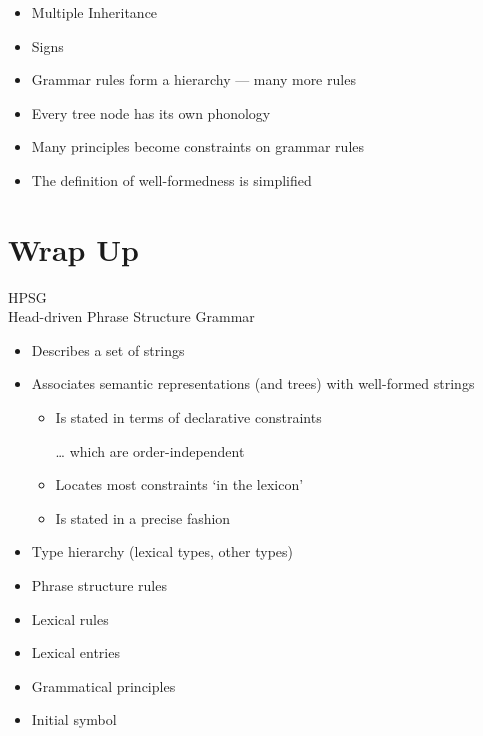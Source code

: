 \documentclass[a4paper,landscape,headrule,footrule]{foils}
\begin{document}

\begin{itemize}
\item Multiple Inheritance
\item Signs
\item Grammar rules form a hierarchy --- many more rules
\item Every tree node has its own phonology
\item Many principles become constraints on 
grammar rules
\item The definition of well-formedness is 
simplified
\end{itemize}




\section{Wrap Up}

\begin{center}
  \LARGE HPSG \\
  \Large Head-driven Phrase Structure Grammar  
\end{center}

\begin{itemize}
\item Describes a set of strings
\item Associates semantic representations (and
trees) with well-formed strings
\begin{itemize}
\item Is stated in terms of declarative constraints
\item[\ldots]  which are order-independent
\item Locates most constraints `in the lexicon'
\item Is stated in a precise fashion
\end{itemize}
\end{itemize}


\begin{itemize}
\item Type hierarchy (lexical types, other types)
\item Phrase structure rules
\item Lexical rules
\item Lexical entries
\item Grammatical principles
\item Initial symbol
\end{itemize}
\end{document}
